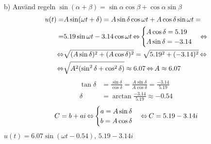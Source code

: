 \begin{task}{b)}
	Använd regeln $\sin(\alpha+\beta)=\sin\alpha\cos\beta+\cos\alpha\sin\beta$
	\begin{align*}
	u(t)=
	&A\sin(\omega t + \delta)=
	A\sin\delta\cos\omega t + A\cos\delta\sin\omega t= \\ =
	&5.19\sin\omega t - 3.14\cos\omega t \operatorname{\Leftrightarrow}
	\begin{cases}
	A\cos\delta = 5.19 \\
	A\sin\delta = -3.14
	\end{cases} \operatorname{\Leftrightarrow} \\ \operatorname{\Leftrightarrow}
	&\sqrt{(A\sin\delta)^2+(A\cos\delta)^2}=\sqrt{5.19^2+(-3.14)^2} \operatorname{\Leftrightarrow} \\ \operatorname{\Leftrightarrow}
	&\sqrt{A^2(\sin^2\delta+\cos^2\delta)}\approx 6.07 \operatorname{\Leftrightarrow}
	A\approx 6.07
	\end{align*}
	\begin{align*}
	\tan\delta&=
	\frac{\sin\delta}{\cos\delta}=
	\frac{A\sin\delta}{A\cos\delta}=
	\frac{-3.14}{5.19} \\
	\delta&=
	\arctan\frac{-3.14}{5.19}\approx 
	-0.54
	\end{align*}
	\[C=b+ai \operatorname{\Leftrightarrow}
	\begin{cases}
	a = A\sin\delta \\
	b = A\cos\delta
	\end{cases} \operatorname{\Leftrightarrow}
	C= 5.19-3.14i\]
	\ans $u(t)=6.07\sin(\omega t - 0.54)$, $5.19-3.14i$
\end{task}